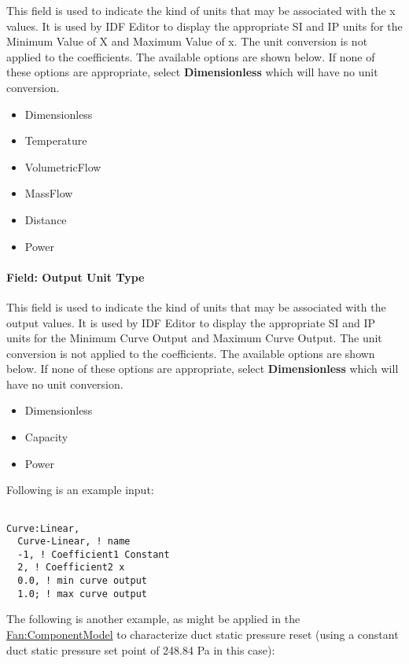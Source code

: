 This field is used to indicate the kind of units that may be associated with the x values. It is used by IDF Editor to display the appropriate SI and IP units for the Minimum Value of X and Maximum Value of x. The unit conversion is not applied to the coefficients. The available options are shown below. If none of these options are appropriate, select \textbf{Dimensionless} which will have no unit conversion.

\begin{itemize}
\item
  Dimensionless
\item
  Temperature
\item
  VolumetricFlow
\item
  MassFlow
\item
  Distance
\item
  Power
\end{itemize}

\paragraph{Field: Output Unit Type}\label{field-output-unit-type}

This field is used to indicate the kind of units that may be associated with the output values. It is used by IDF Editor to display the appropriate SI and IP units for the Minimum Curve Output and Maximum Curve Output. The unit conversion is not applied to the coefficients. The available options are shown below. If none of these options are appropriate, select \textbf{Dimensionless} which will have no unit conversion.

\begin{itemize}
\item
  Dimensionless
\item
  Capacity
\item
  Power
\end{itemize}

Following is an example input:

\begin{lstlisting}

Curve:Linear,
  Curve-Linear, ! name
  -1, ! Coefficient1 Constant
  2, ! Coefficient2 x
  0.0, ! min curve output
  1.0; ! max curve output
\end{lstlisting}

The following is another example, as might be applied in the \hyperref[fancomponentmodel]{Fan:ComponentModel} to characterize duct static pressure reset (using a constant duct static pressure set point of 248.84 Pa in this case):

